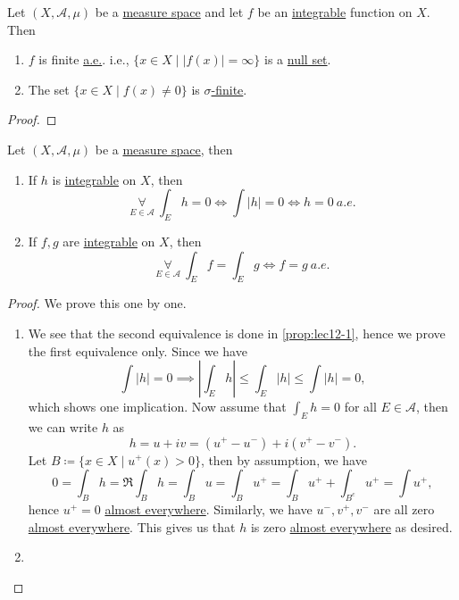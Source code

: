 \begin{lemma}\label{lma:lec-13-2}
	Let \((X, \mathcal{A} , \mu )\) be a \hyperref[def:measure-space]{measure space} and let \(f\) be an \hyperref[def:integrable]{integrable} function on \(X\).
	Then
	\begin{enumerate}[(1)]
		\item \(f\) is finite \hyperref[def:mu-almost-everywhere]{a.e.}. i.e., \(\{x\in X \mid \left\vert f(x) \right\vert = \infty \}\) is a \hyperref[def:mu-null-set]{null set}.
		\item The set \(\{x\in X \mid f(x)\neq 0\}\) is \hyperref[def:finite-measure]{\(\sigma \)-finite}.
	\end{enumerate}
\end{lemma}
\begin{proof}
\end{proof}

\begin{proposition}\label{prop:lec-13}
	Let \((X, \mathcal{A} , \mu )\) be a \hyperref[def:measure-space]{measure space}, then
	\begin{enumerate}[(1)]
		\item If \(h\) is \hyperref[def:integrable]{integrable} on \(X\), then
		      \[
			      \underset{E\in \mathcal{A} }{\forall }\ \int_E h = 0 \iff \int \left\vert h \right\vert = 0 \iff h = 0\ \hyperref[def:mu-almost-everywhere]{a.e.}
		      \]
		\item If \(f, g\) are \hyperref[def:integrable]{integrable} on \(X\), then
		      \[
			      \underset{E\in \mathcal{A} }{\forall }\ \int _E f = \int _E g \iff f = g\ \hyperref[def:mu-almost-everywhere]{a.e.}
		      \]
	\end{enumerate}
\end{proposition}
\begin{proof}
	We prove this one by one.
	\begin{enumerate}[(1)]
		\item We see that the second equivalence is done in \autoref{prop:lec12-1}, hence we prove the first equivalence only.
		      Since we have
		      \[
			      \int \left\vert h \right\vert = 0 \implies \left\vert \int _E h \right\vert \leq \int _E \left\vert h \right\vert \leq \int \left\vert h \right\vert = 0,
		      \]
		      which shows one implication. Now assume that \(\int _E h = 0\) for all \(E\in \mathcal{A} \), then we can write \(h\) as
		      \[
			      h = u + iv = (u^+ - u^-) + i (v^+ - v^-).
		      \]
		      Let \(B\coloneqq \{x\in X \mid u^+(x)>0\}\), then by assumption, we have
		      \[
			      0 = \int _B h = \Re \int _B h = \int _B u = \int _B u^+ = \int _B u^+ + \int _{B^{c}} u^+ = \int u^+,
		      \]
		      hence \(u^+ = 0\) \hyperref[def:mu-almost-everywhere]{almost everywhere}. Similarly, we have \(u^-, v^+, v^-\) are all zero \hyperref[def:mu-almost-everywhere]{almost everywhere}.
		      This gives us that \(h\) is zero  \hyperref[def:mu-almost-everywhere]{almost everywhere} as desired.
		\item {}
	\end{enumerate}
\end{proof}

